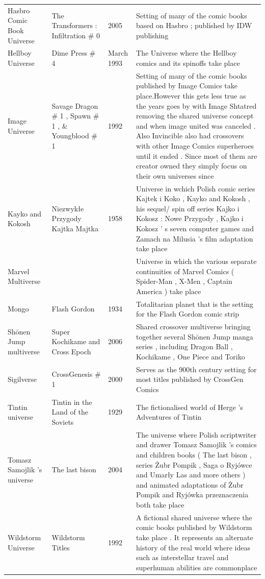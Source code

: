 \documentclass{article}
\begin{document}
\begin{tabular}{llll}
Hasbro Comic Book Universe & The Transformers : Infiltration \# 0 & 2005 & Setting of many of the comic books based on Hasbro ; published by IDW publishing \\
Hellboy Universe & Dime Press \# 4 & March 1993 & The Universe where the Hellboy comics and its spinoffs take place \\
Image Universe & Savage Dragon \# 1 , Spawn \# 1 , \& Youngblood \# 1 & 1992 & Setting of many of the comic books published by Image Comics take place.However this gets less true as the years goes by with Image Shtatred removing the shared universe concept and when image united was canceled . Also Invincible also had crossovers with other Image Comics superheroes until it ended . Since most of them are creator owned they simply focus on their own universes since \\
Kayko and Kokosh & Niezwykłe Przygody Kajtka Majtka & 1958 & Universe in wchich Polish comic series Kajtek i Koko , Kayko and Kokosh , his sequel/ spin off series Kajko i Kokosz : Nowe Przygody , Kajko i Kokosz ' s seven computer games and Zamach na Milusia 's film adaptation take place \\
Marvel Multiverse &  &  & Universe in which the various separate continuities of Marvel Comics ( Spider-Man , X-Men , Captain America ) take place \\
Mongo & Flash Gordon & 1934 & Totalitarian planet that is the setting for the Flash Gordon comic strip \\
Shōnen Jump multiverse & Super Kochikame and Cross Epoch & 2006 & Shared crossover multiverse bringing together several Shōnen Jump manga series , including Dragon Ball , Kochikame , One Piece and Toriko \\
Sigilverse & CrossGenesis \# 1 & 2000 & Serves as the 900th century setting for most titles published by CrossGen Comics \\
Tintin universe & Tintin in the Land of the Soviets & 1929 & The fictionalised world of Herge 's Adventures of Tintin \\
Tomasz Samojlik 's universe & The last bison & 2004 & The universe where Polish scriptwriter and drawer Tomasz Samojlik 's comics and children books ( The last bison , series Żubr Pompik , Saga o Ryjówce and Umarły Las and more others ) and animated adaptations of Żubr Pompik and Ryjówka przeznaczenia both take place \\
Wildstorm Universe & Wildstorm Titles & 1992 & A fictional shared universe where the comic books published by Wildstorm take place . It represents an alternate history of the real world where ideas such as interstellar travel and superhuman abilities are commonplace \\
\bottomrule
\end{tabular}
\end{document}
